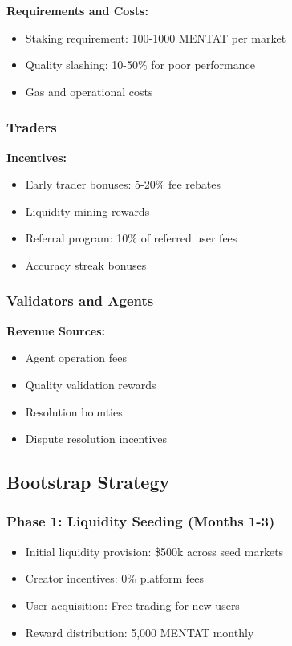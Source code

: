 \documentclass[11pt,a4paper]{article}
\begin{document}
\textbf{Requirements and Costs:}
\begin{itemize}
    \item Staking requirement: 100-1000 MENTAT per market
    \item Quality slashing: 10-50\% for poor performance
    \item Gas and operational costs
\end{itemize}

\subsubsection{Traders}
\textbf{Incentives:}
\begin{itemize}
    \item Early trader bonuses: 5-20\% fee rebates
    \item Liquidity mining rewards
    \item Referral program: 10\% of referred user fees
    \item Accuracy streak bonuses
\end{itemize}

\subsubsection{Validators and Agents}
\textbf{Revenue Sources:}
\begin{itemize}
    \item Agent operation fees
    \item Quality validation rewards
    \item Resolution bounties
    \item Dispute resolution incentives
\end{itemize}

\subsection{Bootstrap Strategy}

\subsubsection{Phase 1: Liquidity Seeding (Months 1-3)}
\begin{itemize}
    \item Initial liquidity provision: \$500k across seed markets
    \item Creator incentives: 0\% platform fees
    \item User acquisition: Free trading for new users
    \item Reward distribution: 5,000 MENTAT monthly
\end{itemize}
\end{document}
